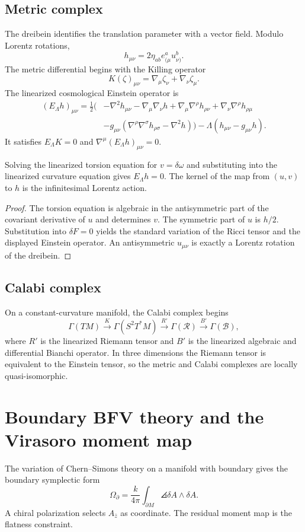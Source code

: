 \section{Metric complex}
The dreibein identifies the translation parameter with a vector field.  Modulo Lorentz rotations,
\[
 h_{\mu\nu}=2\eta_{ab}e^a_{(\mu}u^b_{\nu)}.
\]
The metric differential begins with the Killing operator
\[
 K(\zeta)_{\mu\nu}=\nabla_\mu\zeta_\nu+\nabla_\nu\zeta_\mu.
\]
The linearized cosmological Einstein operator is
\[
 \begin{aligned}
 (E_\Lambda h)_{\mu\nu}
 =\frac12\bigl(&-\nabla^2h_{\mu\nu}-\nabla_\mu\nabla_\nu h
 +\nabla_\mu\nabla^\rho h_{\rho\nu}
 +\nabla_\nu\nabla^\rho h_{\rho\mu}\\
 &-g_{\mu\nu}(\nabla^\rho\nabla^\sigma h_{\rho\sigma}-\nabla^2h)
 \bigr)-\Lambda(h_{\mu\nu}-g_{\mu\nu}h).
 \end{aligned}
\]
It satisfies $E_\Lambda K=0$ and $\nabla^\mu(E_\Lambda h)_{\mu\nu}=0$.

\begin{theorem}
Solving the linearized torsion equation for $v=\delta\omega$ and substituting into the linearized curvature equation gives $E_\Lambda h=0$.  The kernel of the map from $(u,v)$ to $h$ is the infinitesimal Lorentz action.
\end{theorem}
\begin{proof}
The torsion equation is algebraic in the antisymmetric part of the covariant derivative of $u$ and determines $v$.  The symmetric part of $u$ is $h/2$.  Substitution into $\delta F=0$ yields the standard variation of the Ricci tensor and the displayed Einstein operator.  An antisymmetric $u_{\mu\nu}$ is exactly a Lorentz rotation of the dreibein.
\end{proof}

\section{Calabi complex}
On a constant-curvature manifold, the Calabi complex begins
\[
 \Gamma(TM)
 \xrightarrow{K}
 \Gamma(S^2T^*M)
 \xrightarrow{R'}
 \Gamma(\mathcal R)
 \xrightarrow{B'}
 \Gamma(\mathcal B),
\]
where $R'$ is the linearized Riemann tensor and $B'$ is the linearized algebraic and differential Bianchi operator.  In three dimensions the Riemann tensor is equivalent to the Einstein tensor, so the metric and Calabi complexes are locally quasi-isomorphic.

\chapter{Boundary BFV theory and the Virasoro moment map}
The variation of Chern--Simons theory on a manifold with boundary gives the boundary symplectic form
\[
 \Omega_{\partial}=\frac{k}{4\pi}\int_{\partial M}\angles{\delta A\wedge\delta A}.
\]
A chiral polarization selects $A_{\bar z}$ as coordinate.  The residual moment map is the flatness constraint.

